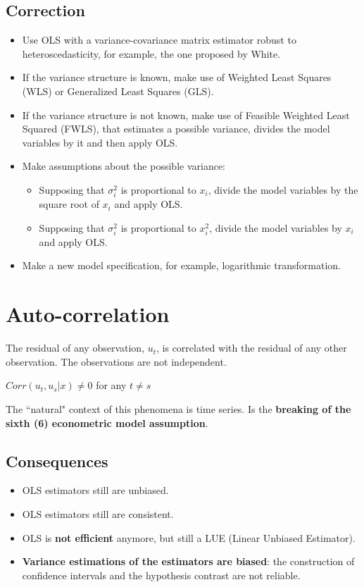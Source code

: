 \documentclass[10pt, a4paper, landscape]{extarticle}
\begin{document}
\begin{multicols}{3}
	\subsection*{Correction}
		\begin{itemize}[leftmargin=*]
			\item Use OLS with a variance-covariance matrix estimator robust to heteroscedasticity, for example, the one proposed by White.
			\item If the variance structure is known, make use of Weighted Least Squares (WLS) or Generalized Least Squares (GLS).
			\item If the variance structure is not known, make use of Feasible Weighted Least Squared (FWLS), that estimates a possible variance, divides the model variables by it and then apply OLS.
			\item Make assumptions about the possible variance:
			\begin{itemize}[leftmargin=*]
				\item Supposing that $\sigma_i^2$ is proportional to $x_i$, divide the model variables by the square root of $x_i$ and apply OLS.
				\item Supposing that $\sigma_i^2$ is proportional to $x_i^2$, divide the model variables by $x_i$ and apply OLS.
			\end{itemize}
			\item Make a new model specification, for example, logarithmic transformation.
		\end{itemize}
\columnbreak
\section*{Auto-correlation}
	The residual of any observation, $u_t$, is correlated with the residual of any other observation. The observations are not independent.
	\begin{center}
		$Corr(u_t, u_s | x) \neq 0$ for any $t \neq s$
	\end{center}
	The ``natural" context of this phenomena is time series. Is the \textbf{breaking of the sixth (6) econometric model assumption}.
	\subsection*{Consequences}
		\begin{itemize}[leftmargin=*]
			\item OLS estimators still are unbiased.
			\item OLS estimators still are consistent.
			\item OLS is \textbf{not efficient} anymore, but still a LUE (Linear Unbiased Estimator).
			\item \textbf{Variance estimations of the estimators are biased}: the construction of confidence intervals and the hypothesis contrast are not reliable.
		\end{itemize}

\end{multicols}
\end{document}
